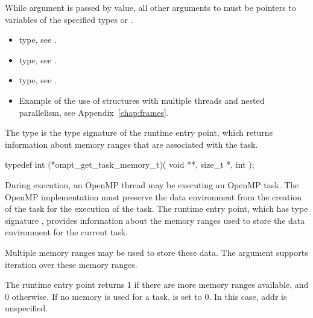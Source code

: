 \constraints
While argument  is passed by value, all other arguments to 
 must be pointers to variables of the specified types 
or .

\crossreferences
\begin{itemize}
\item {} type, see .

\item {} type, see .

\item {} type, see .

\item Example of the use of  structures with multiple
      threads and nested parallelism, see Appendix~\ref{chap:frames}.
\end{itemize}



\label{sec:ompt_get_task_memory_t}
\label{sec:ompt_get_task_memory}

\summary
The  type is the type signature of the 
 runtime entry point, which returns information 
about memory ranges that are associated with the task.

\format
\begin{ccppspecific}
\begin{omptInquiry}
typedef int (*ompt_get_task_memory_t)(
  void **,
  size_t *,
  int 
);
\end{omptInquiry}
\end{ccppspecific}

\descr
During execution, an OpenMP thread may be executing an OpenMP task. The 
OpenMP implementation must preserve the data environment from the creation 
of the task for the execution of the task. The  
runtime entry point, which has type signature ,
provides information about the  memory ranges used to store the data 
environment for the current task.

Multiple memory ranges may be used to store these data. The  
argument supports iteration over these memory ranges.

The  runtime entry point returns 1 if there 
are more memory ranges available, and 0 otherwise. If no memory is used 
for a task,  is set to 0. In this case, addr is unspecified.

